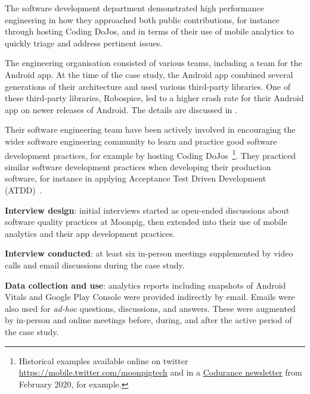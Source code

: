 The software development department demonstrated high performance engineering in how they approached both public contributions, for instance through hosting Coding DoJos, and in terms of their use of mobile analytics to quickly triage and address pertinent issues.

The engineering organisation consisted of various teams, including a team for the Android app. At the time of the case study, the Android app combined several generations of their architecture and used various third-party libraries. One of these third-party libraries, Robospice, led to a higher crash rate for their Android app on newer releases of Android. The details are discussed in .

Their software engineering team have been actively involved in encouraging the wider software engineering community to learn and practice good software development practices, for example by hosting Coding DoJos~\footnote{Historical examples available online on twitter \url{https://mobile.twitter.com/moonpigtech} and in a \href{https://www.codurance.com/publications/newsletters/2020-02-13-newsletter}{Codurance newsletter} from February 2020, for example.}. They practiced similar software development practices when developing their production software, for instance in applying Acceptance Test Driven Development (ATDD)~.

\textbf{Interview design}:  initial interviews started as open-ended discussions about software quality practices at Moonpig, then extended into their use of mobile analytics and their app development practices. 

\textbf{Interview conducted}: at least six in-person meetings supplemented by video calls and email discussions during the case study.

\textbf{Data collection and use}: analytics reports including snapshots of Android Vitals and Google Play Console were provided indirectly by email. Emails were also used for \emph{ad-hoc} questions, discussions, and answers. These were augmented by in-person and online meetings before, during, and after the active period of the case study.


